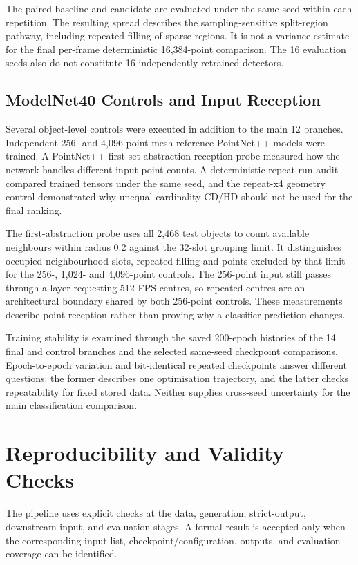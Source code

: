 The paired baseline and candidate are evaluated under the same
seed within each repetition. The resulting spread describes the
sampling-sensitive split-region pathway, including repeated filling
of sparse regions. It is not a variance estimate for the final
per-frame deterministic 16,384-point comparison. The 16 evaluation
seeds also do not constitute 16 independently retrained detectors.

\subsection{ModelNet40 Controls and Input Reception}
\label{sec:fc-4-12-7}

Several object-level controls were executed in addition to the main 12 branches. Independent 256- and 4,096-point mesh-reference PointNet++ models were trained. A PointNet++ first-set-abstraction reception probe measured how the network handles different input point counts. A deterministic repeat-run audit compared trained tensors under the same seed, and the repeat-x4 geometry control demonstrated why unequal-cardinality CD/HD should not be used for the final ranking.

The first-abstraction probe uses all 2,468 test objects to
count available neighbours within radius 0.2 against the 32-slot
grouping limit. It distinguishes occupied neighbourhood slots,
repeated filling and points excluded by that limit for the
256-, 1,024- and 4,096-point controls. The 256-point input still
passes through a layer requesting 512 FPS centres, so repeated
centres are an architectural boundary shared by both 256-point
controls. These measurements describe point reception rather than
proving why a classifier prediction changes.

Training stability is examined through the saved 200-epoch
histories of the 14 final and control branches and the selected
same-seed checkpoint comparisons. Epoch-to-epoch variation and
bit-identical repeated checkpoints answer different questions:
the former describes one optimisation trajectory, and the latter
checks repeatability for fixed stored data. Neither supplies
cross-seed uncertainty for the main classification comparison.

\section{Reproducibility and Validity Checks}
\label{sec:fc-4-13}
\label{sec:fc-4-14}

The pipeline uses explicit checks at the data, generation, strict-output, downstream-input, and evaluation stages. A formal result is accepted only when the corresponding input list, checkpoint/configuration, outputs, and evaluation coverage can be identified.


